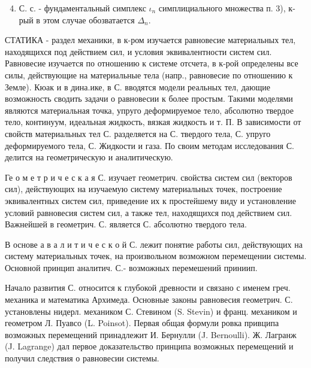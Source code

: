 \documentclass[10pt]{article}
\begin{document}
\begin{enumerate}

  \setcounter{enumi}{3}

  \item С. с. - фундаментальный симплекс $\iota_{n}$ симплициального множества п. 3), к-рый в этом случае обозватается $\Delta_{n}$.

\end{enumerate}



СТАТИКА - раздел механики, в к-ром изучается равновесие материальных тел, находящихся под действием сил, и условия эквивалентности систем сил. Равновесие изучается по отношению к системе отсчета, в к-рой определены все силы, действующие на материальные тела (напр., равновесие по отношению к Земле). Кюак и в дина.ике, в С. вводятся модели реальных тел, дающие возможность сводить задачи о равновесии к более простым. Такими моделями являются материальная точка, упруго деформируемое тело, абсолютно твердое тело, континуум, идеальная жидкость, вязкая жидкость и т. П. В зависимости от свойств материальных тел С. разделяется на С. твердого тела, С. упруго деформируемого тела, С. Жидкости и газа. По своим методам исследования С. делится на геометрическую и аналитическую.



Ге о м е т р и ч е с к а я С. изучает геометрич. свойства систем сил (векторов сил), действующих на изучаемую систему материальных точек, построение эквивалентных систем сил, приведение их к простейшему виду и установление условий равновесия систем сил, а также тел, находящихся под действием сил. Важнейшей в геометрич. С. является С. абсолютно твердого тела.



В основе а в а л и т и ч е с к о й С. лежит понятие работы сил, действующих на систему материальных точек, на произвольном возможном перемещении системы. Основной принцип аналитич. С.- возможных перемешений приниип.



Начало развития С. относится к глубокой древности и связано с именем греч. механика и математика Архимеда. Основные законы равновесия геометрич. С. установлены нидерл. механиком С. Стевином (S. Stevin) и франц. механиком и геометром Л. Пуавсо (L. Poinsot). Первая общая формули ровка привципа возможных перемещений принадлежит И. Бернулли (J. Bernoulli). Ж. Лагранж (J. Lagrange) дал первое доказательство принципа возможных перемещений и получил следствия о равновесии системы.
\end{document}
